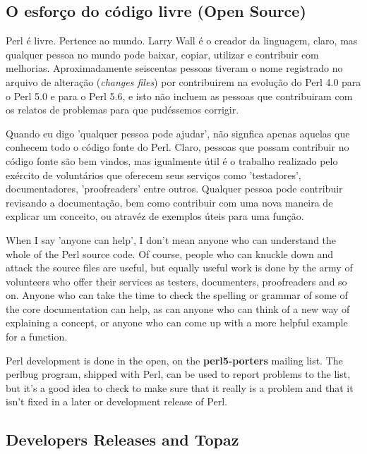 \documentclass[a4paper,11pt]{book}
\begin{document}
\subsection{O esfor\c{c}o do código livre (Open Source)}

\noindent Perl é livre. Pertence ao mundo. Larry Wall é o creador da linguagem, claro, mas qualquer pessoa no mundo pode baixar, copiar, utilizar e contribuir com melhorias. Aproximadamente seiscentas pessoas tiveram o nome registrado no arquivo de alteração (\textit{changes files}) por contribuirem na evolução do Perl 4.0 para o Perl 5.0 e para o Perl 5.6, e isto não incluem as pessoas que contribuiram com os relatos de problemas para que pudéssemos  corrigir.

\noindent Quando eu digo 'qualquer pessoa pode ajudar', não signfica apenas aquelas que conhecem todo o código fonte do Perl. Claro, pessoas que possam contribuir no código fonte são bem vindos, mas igualmente útil é o trabalho realizado pelo exército de voluntários que oferecem seus serviços como 'testadores', documentadores, 'proofreaders' entre outros. Qualquer pessoa pode contribuir revisando a documenta\c{c}ão, bem como contribuir com uma nova maneira de explicar um conceito, ou atravéz de exemplos úteis para uma fun\c{c}ão.

\noindent When I say 'anyone can help', I don't mean anyone who can understand the whole of the Perl source code. Of course, people who can knuckle down and attack the source files are useful, but equally useful work is done by the army of volunteers who offer their services as testers, documenters, proofreaders and so on. Anyone who can take the time to check the spelling or grammar of some of the core documentation can help, as can anyone who can think of a new way of explaining a concept, or anyone who can come up with a more helpful example for a function.

\noindent 

\noindent Perl development  is done  in the  open,  on  the  \textbf{perl5-porters  }mailing  list.  The perlbug program, shipped with Perl,  can be used  to  report  problems  to  the  list,  but it's  a  good idea  to  check  to make sure that it really is a problem and that it isn't fixed in a later or development release of Perl.

\noindent 

\subsection{Developers Releases and Topaz}
\end{document}
